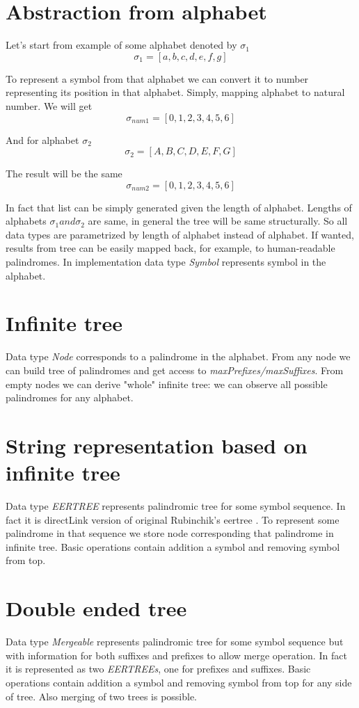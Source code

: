 \section{Abstraction from alphabet}
Let's start from example of some alphabet denoted by $\sigma_1$ 
$$\sigma_1 = [a, b, c, d, e, f, g]$$

To represent a symbol from that alphabet we can convert it to number representing its position in that alphabet. Simply, mapping alphabet to natural number. We will get
$$\sigma_{num1} = [0, 1, 2, 3, 4, 5, 6]$$

And for alphabet $\sigma_2$
$$\sigma_2 = [A, B, C, D, E, F, G]$$

The result will be the same
$$\sigma_{num2} = [0, 1, 2, 3, 4, 5, 6]$$

In fact that list can be simply generated given the length of alphabet.
Lengths of alphabets $\sigma_1 and \sigma_2$ are same, in general the tree will be same structurally. So all data types are parametrized by length of alphabet instead of alphabet. If wanted, results from tree can be easily mapped back, for example, to human-readable palindromes.
In implementation data type \textit{Symbol} represents symbol in the alphabet.

\section{Infinite tree}
Data type \textit{Node} corresponds to a palindrome in the alphabet. From any node we can build tree of palindromes and get access to \textit{maxPrefixes/maxSuffixes}. From empty nodes we can derive "whole" infinite tree: we can observe all possible palindromes for any alphabet.

\section{String representation based on infinite tree}
Data type \textit{EERTREE} represents palindromic tree for some symbol sequence. In fact it is directLink version of original Rubinchik's eertree \cite{RUBINCHIK2018249}. To represent some palindrome in that sequence we store node corresponding that palindrome in infinite tree. Basic operations contain addition a symbol and removing symbol from top.

\section{Double ended tree}
Data type \textit{Mergeable} represents palindromic tree for some symbol sequence but with information for both suffixes and prefixes to allow merge operation. In fact it is represented as two \textit{EERTREEs}, one for prefixes and suffixes. Basic operations contain addition a symbol and removing symbol from top for any side of tree. Also merging of two trees is possible.  
